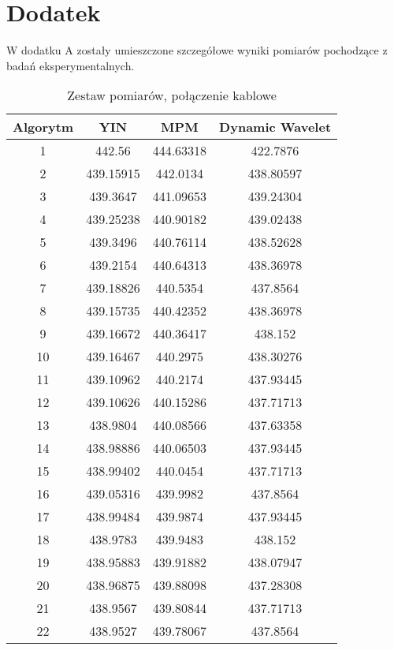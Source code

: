 \chapter{Dodatek}
\label{chapter:dodatek_A}
W dodatku A zostały umieszczone szczegółowe wyniki pomiarów pochodzące z badań eksperymentalnych.
\begin{table}
\begin{center}
\caption[Zestaw pomiarów, połączenie kablowe]{Zestaw pomiarów, połączenie kablowe}
\begin{tabular}{|c|c|c|c|}
\hline
{\bf Algorytm} & {\bf YIN} & {\bf MPM} & {\bf Dynamic Wavelet} \\ 
\hline
1  & 442.56    & 444.63318 & 422.7876  \\ \hline 
2  & 439.15915 & 442.0134  & 438.80597 \\ \hline 
3  & 439.3647  & 441.09653 & 439.24304 \\ \hline 
4  & 439.25238 & 440.90182 & 439.02438 \\ \hline 
5  & 439.3496  & 440.76114 & 438.52628 \\ \hline 
6  & 439.2154  & 440.64313 & 438.36978 \\ \hline 
7  & 439.18826 & 440.5354  & 437.8564  \\ \hline 
8  & 439.15735 & 440.42352 & 438.36978 \\ \hline 
9  & 439.16672 & 440.36417 & 438.152   \\ \hline 
10 & 439.16467 & 440.2975  & 438.30276 \\ \hline 
11 & 439.10962 & 440.2174  & 437.93445 \\ \hline 
12 & 439.10626 & 440.15286 & 437.71713 \\ \hline 
13 & 438.9804  & 440.08566 & 437.63358 \\ \hline 
14 & 438.98886 & 440.06503 & 437.93445 \\ \hline 
15 & 438.99402 & 440.0454  & 437.71713 \\ \hline 
16 & 439.05316 & 439.9982  & 437.8564  \\ \hline 
17 & 438.99484 & 439.9874  & 437.93445 \\ \hline 
18 & 438.9783  & 439.9483  & 438.152   \\ \hline 
19 & 438.95883 & 439.91882 & 438.07947 \\ \hline 
20 & 438.96875 & 439.88098 & 437.28308 \\ \hline 
21 & 438.9567  & 439.80844 & 437.71713 \\ \hline 
22 & 438.9527  & 439.78067 & 437.8564  \\ \hline 

\end{tabular}
\end{center}
\end{table}
